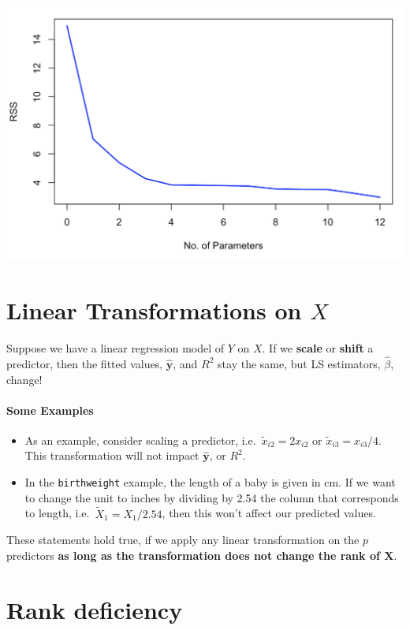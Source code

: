 \documentclass[
]{book}
\begin{document}
\begin{center}\includegraphics[width=0.6\linewidth]{images/week2/rss} \end{center}

\section{\texorpdfstring{Linear Transformations on \(X\)}{Linear Transformations on X}}\label{linear-transformations-on-x}

Suppose we have a linear regression model of \(Y\) on \(X\). If we \textbf{scale} or \textbf{shift} a predictor, then
the fitted values, \(\hat{\mathbf{y}}\), and \(R^2\) stay the same, but LS estimators, \(\hat{\beta}\), change!

\paragraph*{Some Examples}\label{some-examples}

\begin{itemize}
\item
  As an example, consider scaling a predictor, i.e.~\(\tilde{x}_{i2} =  2 x_{i2}\) or \(\tilde{x}_{i3} =  x_{i3}/4\). This transformation will not impact \(\hat{\mathbf{y}}\), or \(R^2\).
\item
  In the \texttt{birthweight} example, the length of a baby is given in cm. If we want to change the unit to inches by dividing by 2.54 the column that corresponds to length, i.e.~\(\tilde{X}_1 = X_1/2.54\), then this won't affect our predicted values.
\end{itemize}

These statements hold true, if we apply any linear transformation on the \(p\) predictors \textbf{as long as the transformation does not change the rank of \(\mathbf{X}\)}.

\section{Rank deficiency}\label{rank-deficiency}
\end{document}
